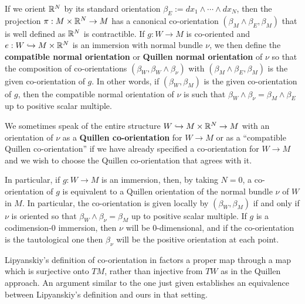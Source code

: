 \begin{definition}\label{D: Quillen normal or}
	If we orient $\mathbb{R}^N$ by its standard orientation $\beta_E:= dx_1\wedge\cdots\wedge dx_N$, then the projection $\pi:M\times \mathbb{R}^N\to M$ has a canonical co-orientation $(\beta_M\wedge \beta_E,\beta_M)$ that is well defined as $\mathbb{R}^N$ is contractible.
	If $g:W\to M$ is co-oriented and $e:W\hookrightarrow M\times \mathbb{R}^N$ is an immersion with normal bundle $\nu$, we then define the \textbf{compatible normal orientation} or \textbf{Quillen normal orientation} of $\nu$ so that the composition of co-orientations $(\beta_W,\beta_W\wedge \beta_\nu)$ with $(\beta_M\wedge \beta_E,\beta_M)$ is the given co-orientation of $g$.
	In other words, if $(\beta_W,\beta_M)$ is the given co-orientation of $g$, then the compatible normal orientation of $\nu$ is such that $\beta_W\wedge \beta_\nu=
	\beta_M\wedge \beta_E$ up to positive scalar multiple.

	We sometimes speak of the entire structure $W\hookrightarrow M\times \mathbb{R}^N\to M$ with an orientation of $\nu$ as a \textbf{Quillen co-orientation} for $W\to M$ or as a ``compatible Quillen co-orientation'' if we have already specified a co-orientation for $W\to M$ and we wish to choose the Quillen co-orientation that agrees with it.
\end{definition}

\begin{remark}\label{R: immersion}
	In particular, if $g: W\to M$ is an immersion, then, by taking $N=0$, a co-orientation of $g$ is equivalent to a Quillen orientation of the normal bundle
	$\nu$ of $W$ in $M$.
	In particular, the co-orientation is given locally by $(\beta_W,\beta_M)$ if and only if $\nu$ is oriented so that $\beta_W\wedge \beta_\nu=
	\beta_M$ up to positive scalar multiple.
	If $g$ is a codimension-$0$ immersion, then $\nu$ will be $0$-dimensional, and if the co-orientation is the tautological one then $\beta_\nu$ will be the positive orientation at each point.
\end{remark}

\begin{remark}
	Lipyanskiy's definition of co-orientation in \cite{Lipy14} factors a proper map through a map which is surjective onto $TM$,
	rather than injective from $TW$ as in the Quillen approach.
	An argument similar to the one just given establishes an equivalence between Lipyanskiy's definition and ours in that setting.
\end{remark}

